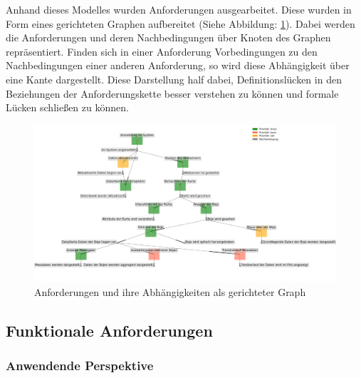     Anhand dieses Modelles  wurden Anforderungen ausgearbeitet. Diese wurden in Form eines gerichteten Graphen aufbereitet (Siehe Abbildung: \ref{fig:graph_anforderungen}). Dabei werden die Anforderungen und deren Nachbedingungen über Knoten des Graphen repräsentiert. Finden sich in einer Anforderung Vorbedingungen zu den Nachbedingungen einer anderen Anforderung, so wird diese Abhängigkeit über eine Kante dargestellt. Diese Darstellung half dabei, Definitionslücken in den Beziehungen  der Anforderungskette besser verstehen zu können und formale Lücken schließen zu können.
      
    \begin{figure}[h!]
    \centering
    \includegraphics[width=\textwidth]{pix/graph_anforderungen.png}
    \caption{Anforderungen und ihre Abhängigkeiten als gerichteter Graph}
    \label{fig:graph_anforderungen}
    \end{figure}
    
     
    \subsection{Funktionale Anforderungen}
    
    \subsubsection{Anwendende Perspektive}
    
